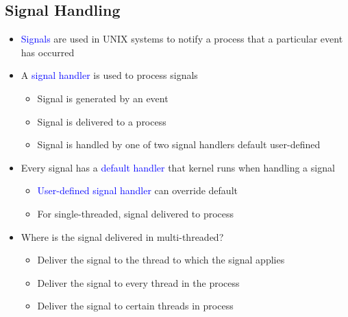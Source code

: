 \documentclass{book/custombook}
\begin{document}
            \subsection{Signal Handling}
                \begin{itemize}
                    \item \textcolor{blue}{Signals} are used in UNIX systems to notify a process that a particular event has occurred
                    \item A \textcolor{blue}{signal handler} is used to process signals
                        \begin{itemize}
                            \item Signal is generated by an event
                            \item Signal is delivered to a process
                            \item Signal is handled by one of two signal handlers
                                \subitem default
                                \subitem user-defined
                        \end{itemize}
                    \item Every signal has a \textcolor{blue}{default handler} that kernel runs when handling a signal
                        \begin{itemize}
                            \item \textcolor{blue}{User-defined signal handler} can override default
                            \item For single-threaded, signal delivered to process
                        \end{itemize}
                    \item Where is the signal delivered in multi-threaded?
                        \begin{itemize}
                            \item Deliver the signal to the thread to which the signal applies
                            \item Deliver the signal to every thread in the process
                            \item Deliver the signal to certain threads in process
                        \end{itemize}
                \end{itemize}
\end{document}
